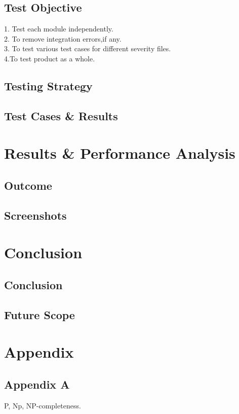\documentclass[oneside,a4paper,12pt]{book}
\begin{document}
\section{Test Objective}
1. Test each module independently. \\
2. To remove integration errors,if any.\\
3. To test various test cases for different severity files.\\
4.To test product as a whole.
\section{Testing Strategy}


\newpage
\section{Test Cases \& Results}

\newpage
\chapter{Results \& Performance Analysis}

\section{Outcome}

\newpage
\section{Screenshots}

\newpage
\chapter{Conclusion}

\section{Conclusion}

\section{Future Scope}

\newpage
\chapter{Appendix}

\newpage
\section{Appendix A}
P, Np, NP-completeness.
\end{document}
